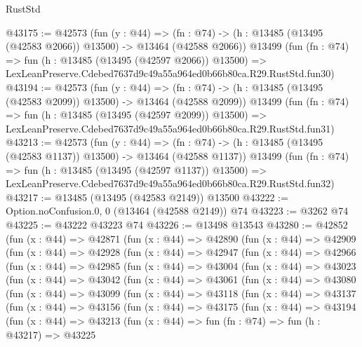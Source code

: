 \begin{lexlean}{RustStd}
\begin{coremodule}
@43175 := @42573
    (fun (y : @44) =>
    (fn : @74) -> (h : @13485 (@13495 (@42583 @2066)) @13500) -> @13464 (@42588 @2066))
    @13499
    (fun (fn : @74) =>
    fun (h : @13485 (@13495 (@42597 @2066)) @13500) =>
    LexLeanPreserve.Cdebed7637d9c49a55a964ed0b66b80ca.R29.RustStd.fun30)
@43194 := @42573
    (fun (y : @44) =>
    (fn : @74) -> (h : @13485 (@13495 (@42583 @2099)) @13500) -> @13464 (@42588 @2099))
    @13499
    (fun (fn : @74) =>
    fun (h : @13485 (@13495 (@42597 @2099)) @13500) =>
    LexLeanPreserve.Cdebed7637d9c49a55a964ed0b66b80ca.R29.RustStd.fun31)
@43213 := @42573
    (fun (y : @44) =>
    (fn : @74) -> (h : @13485 (@13495 (@42583 @1137)) @13500) -> @13464 (@42588 @1137))
    @13499
    (fun (fn : @74) =>
    fun (h : @13485 (@13495 (@42597 @1137)) @13500) =>
    LexLeanPreserve.Cdebed7637d9c49a55a964ed0b66b80ca.R29.RustStd.fun32)
@43217 := @13485 (@13495 (@42583 @2149)) @13500
@43222 := Option.noConfusion.{0, 0} (@13464 (@42588 @2149)) @74
@43223 := @3262 @74
@43225 := @43222 @43223 @74
@43226 := @13498 @13543
@43280 := @42852
    (fun (x : @44) =>
    @42871
      (fun (x : @44) =>
      @42890
        (fun (x : @44) =>
        @42909
          (fun (x : @44) =>
          @42928
            (fun (x : @44) =>
            @42947
              (fun (x : @44) =>
              @42966
                (fun (x : @44) =>
                @42985
                  (fun (x : @44) =>
                  @43004
                    (fun (x : @44) =>
                    @43023
                      (fun (x : @44) =>
                      @43042
                        (fun (x : @44) =>
                        @43061
                          (fun (x : @44) =>
                          @43080
                            (fun (x : @44) =>
                            @43099
                              (fun (x : @44) =>
                              @43118
                                (fun (x : @44) =>
                                @43137
                                  (fun (x : @44) =>
                                  @43156
                                    (fun (x : @44) =>
                                    @43175
                                      (fun (x : @44) =>
                                      @43194
                                        (fun (x : @44) =>
                                        @43213
                                          (fun (x : @44) =>
                                          fun (fn : @74) =>
                                          fun (h : @43217) =>
                                          @43225

\end{coremodule}
\end{lexlean}
